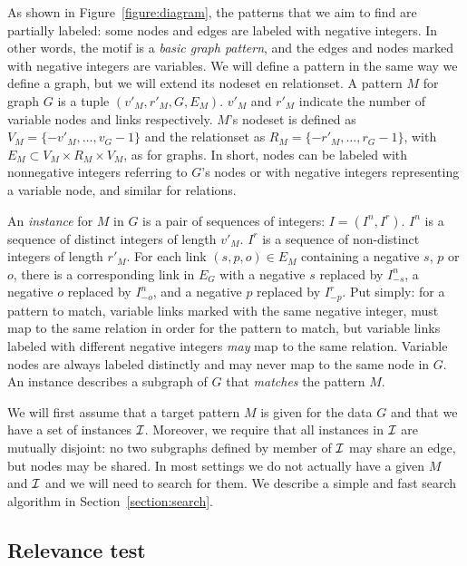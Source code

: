 \documentclass[11pt]{article}
\newcommand{\I}{{\cal I}}
\begin{document}
As shown in Figure~\ref{figure:diagram}, the patterns that we aim to find are partially labeled: some nodes and edges are labeled with negative integers. In other words, the motif is a \emph{basic graph pattern}, and the edges and nodes marked with negative integers are variables. We will define a pattern in the same way we define a graph, but we will extend its nodeset en relationset. A pattern $M$ for graph $G$ is a tuple $(v'_M, r'_M, G, E_M)$. $v'_M$ and $r'_M$ indicate the number of variable nodes and links respectively. $M$'s nodeset is defined as $V_M = \{-v'_M, \ldots, v_G-1\}$ and the relationset as $R_M = \{-r'_M, \ldots, r_G-1\}$, with $E_M \subset V_M \times R_M \times V_M$, as for graphs. In short, nodes can be labeled with nonnegative integers referring to $G$'s nodes or with negative integers representing a variable node, and similar for relations.

An \emph{instance} for $M$ in $G$ is a pair of sequences of integers: $I = (I^n, I^r)$. $I^n$ is a sequence of distinct integers of length $v'_M$. $I^r$ is a sequence of non-distinct integers of length $r'_M$. For each link $(s, p, o) \in E_M$ containing a negative $s$, $p$ or $o$, there is a corresponding link in $E_G$ with a negative $s$ replaced by $I^n_{-s}$, a negative $o$ replaced by $I^n_{-o}$, and a negative $p$ replaced by $I^r_{-p}$. Put simply: for a pattern to match, variable links marked with the same negative integer, must map to the same relation in order for the pattern to match, but variable links labeled with different negative integers \emph{may} map to the same relation. Variable nodes are always labeled distinctly and may never map to the same node in $G$. An instance describes a subgraph of $G$ that \emph{matches} the pattern $M$. 

We will first assume that a target pattern $M$ is given for the data $G$ and that we have a set of instances $\I$. Moreover, we require that all instances in $\I$ are mutually disjoint: no two subgraphs defined by member of $\I$ may share an edge, but nodes may be shared. In most settings we do not actually have a given $M$ and $\I$ and we will need to search for them. We describe a simple and fast search algorithm in Section~\ref{section:search}.

\subsection{Relevance test}

\label{section:relevance-test}
\end{document}

